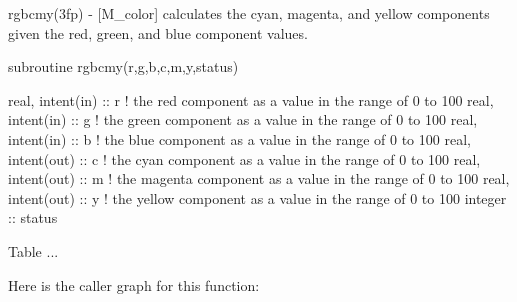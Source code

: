 \begin{DoxyDescription}
\item[\label{_RGBCMY}%
N\+A\+ME ]rgbcmy(3fp) -\/ \mbox{[}M\+\_\+color\mbox{]} calculates the cyan, magenta, and yellow components given the red, green, and blue component values. 


\item[S\+Y\+N\+O\+P\+S\+IS ]
\begin{DoxyPre}
    subroutine rgbcmy(r,g,b,c,m,y,status)\end{DoxyPre}



\begin{DoxyPre}     real, intent(in)  :: r ! the red component as a value in the range of 0 to 100
     real, intent(in)  :: g ! the green component as a value in the range of 0 to 100
     real, intent(in)  :: b ! the blue component as a value in the range of 0 to 100
     real, intent(out) :: c ! the cyan component as a value in the range of 0 to 100
     real, intent(out) :: m ! the magenta component as a value in the range of 0 to 100
     real, intent(out) :: y ! the yellow component as a value in the range of 0 to 100
     integer           :: status
    \end{DoxyPre}
 


\item[D\+E\+S\+C\+R\+I\+P\+T\+I\+ON ]Table ... ~\newline
~\newline


\begin{quote}
\tabulinesep=1mm
\end{quote}



\end{DoxyDescription}Here is the caller graph for this function\+:
